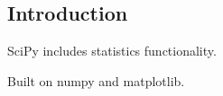 
\subsection{Introduction}

SciPy includes statistics functionality.

Built on numpy and matplotlib.